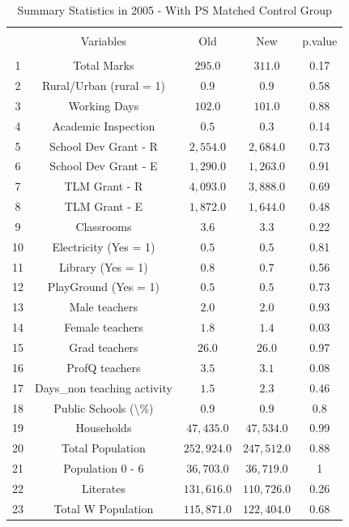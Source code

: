 \documentclass[12pt, a4paper]{article}
\begin{document}
\begin{table}[!htbp] \centering 
  \caption{Summary Statistics in 2005 - With PS Matched Control Group} 
  \label{} 
\begin{tabular}{@{\extracolsep{5pt}} ccccc} 
\\[-1.8ex]\hline 
\hline \\[-1.8ex] 
 & Variables & Old & New & p.value \\ 
\hline \\[-1.8ex] 
1 & Total Marks & $295.0$ & $311.0$ & 0.17 \\ 
2 & Rural/Urban (rural = 1) & $0.9$ & $0.9$ & 0.58 \\ 
3 & Working Days & $102.0$ & $101.0$ & 0.88 \\ 
4 & Academic Inspection & $0.5$ & $0.3$ & 0.14 \\ 
5 & School Dev Grant - R & $2,554.0$ & $2,684.0$ & 0.73 \\ 
6 & School Dev Grant - E & $1,290.0$ & $1,263.0$ & 0.91 \\ 
7 & TLM Grant - R & $4,093.0$ & $3,888.0$ & 0.69 \\ 
8 & TLM Grant - E & $1,872.0$ & $1,644.0$ & 0.48 \\ 
9 & Classrooms & $3.6$ & $3.3$ & 0.22 \\ 
10 & Electricity (Yes = 1) & $0.5$ & $0.5$ & 0.81 \\ 
11 & Library  (Yes = 1) & $0.8$ & $0.7$ & 0.56 \\ 
12 & PlayGround  (Yes = 1) & $0.5$ & $0.5$ & 0.73 \\ 
13 & Male teachers & $2.0$ & $2.0$ & 0.93 \\ 
14 & Female teachers & $1.8$ & $1.4$ & 0.03 \\ 
15 & Grad teachers & $26.0$ & $26.0$ & 0.97 \\ 
16 & ProfQ teachers & $3.5$ & $3.1$ & 0.08 \\ 
17 & Days\_non teaching activity & $1.5$ & $2.3$ & 0.46 \\ 
18 & Public Schools (\textbackslash \%) & $0.9$ & $0.9$ & 0.8 \\ 
19 & Households & $47,435.0$ & $47,534.0$ & 0.99 \\ 
20 & Total Population & $252,924.0$ & $247,512.0$ & 0.88 \\ 
21 & Population 0 - 6 & $36,703.0$ & $36,719.0$ & 1 \\ 
22 & Literates & $131,616.0$ & $110,726.0$ & 0.26 \\ 
23 & Total W Population & $115,871.0$ & $122,404.0$ & 0.68 \\ 

\end{tabular}
\end{table}
\end{document}
